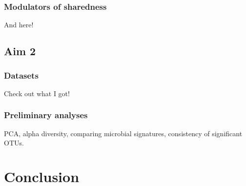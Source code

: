 \documentclass[12pt]{article}
\begin{document}
\subsubsection*{Modulators of sharedness}
And here!

\subsection*{Aim 2}
\subsubsection*{Datasets}
Check out what I got!
\subsubsection*{Preliminary analyses}
PCA, alpha diversity, comparing microbial signatures, consistency of significant OTUs.

\section*{Conclusion}
\end{document}
